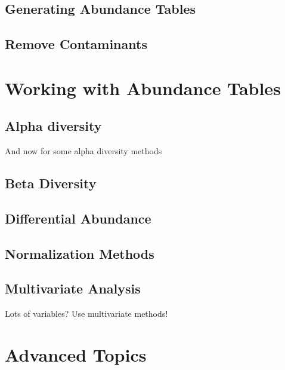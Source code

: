 \documentclass[
]{book}
\begin{document}
\hypertarget{generating-abundance-tables}{%
\chapter{Generating Abundance Tables}\label{generating-abundance-tables}}

\hypertarget{remove-contaminants}{%
\chapter{Remove Contaminants}\label{remove-contaminants}}

\hypertarget{part-working-with-abundance-tables}{%
\part{Working with Abundance Tables}\label{part-working-with-abundance-tables}}

\hypertarget{alpha-diversity}{%
\chapter{Alpha diversity}\label{alpha-diversity}}

And now for some alpha diversity methods

\hypertarget{beta-diversity}{%
\chapter{Beta Diversity}\label{beta-diversity}}

\hypertarget{differential-abundance}{%
\chapter{Differential Abundance}\label{differential-abundance}}

\hypertarget{normalization-methods}{%
\chapter{Normalization Methods}\label{normalization-methods}}

\hypertarget{multivariate-analysis}{%
\chapter{Multivariate Analysis}\label{multivariate-analysis}}

Lots of variables? Use multivariate methods!

\hypertarget{part-advanced-topics}{%
\part{Advanced Topics}\label{part-advanced-topics}}
\end{document}

